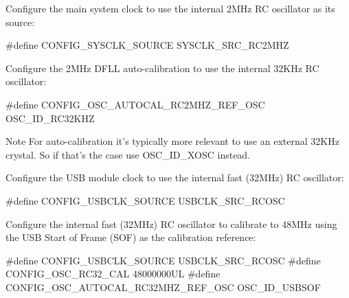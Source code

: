 \begin{DoxyEnumerate}
\item Configure the main system clock to use the internal 2\-M\-Hz R\-C oscillator as its source\-: 
\begin{DoxyCode}
\textcolor{preprocessor}{        #define CONFIG\_SYSCLK\_SOURCE                SYSCLK\_SRC\_RC2MHZ}
\end{DoxyCode}

\item Configure the 2\-M\-Hz D\-F\-L\-L auto-\/calibration to use the internal 32\-K\-Hz R\-C oscillator\-: 
\begin{DoxyCode}
\textcolor{preprocessor}{        #define CONFIG\_OSC\_AUTOCAL\_RC2MHZ\_REF\_OSC   OSC\_ID\_RC32KHZ}
\end{DoxyCode}
 \begin{DoxyNote}{Note}
For auto-\/calibration it's typically more relevant to use an external 32\-K\-Hz crystal. So if that's the case use O\-S\-C\-\_\-\-I\-D\-\_\-\-X\-O\-S\-C instead.
\end{DoxyNote}

\item Configure the U\-S\-B module clock to use the internal fast (32\-M\-Hz) R\-C oscillator\-: 
\begin{DoxyCode}
\textcolor{preprocessor}{        #define CONFIG\_USBCLK\_SOURCE                USBCLK\_SRC\_RCOSC}
\end{DoxyCode}

\item Configure the internal fast (32\-M\-Hz) R\-C oscillator to calibrate to 48\-M\-Hz using the U\-S\-B Start of Frame (S\-O\-F) as the calibration reference\-: 
\begin{DoxyCode}
\textcolor{preprocessor}{        #define CONFIG\_USBCLK\_SOURCE                USBCLK\_SRC\_RCOSC}
\textcolor{preprocessor}{}\textcolor{preprocessor}{        #define CONFIG\_OSC\_RC32\_CAL                 48000000UL}
\textcolor{preprocessor}{        #define CONFIG\_OSC\_AUTOCAL\_RC32MHZ\_REF\_OSC  OSC\_ID\_USBSOF}
\end{DoxyCode}
 
\end{DoxyEnumerate}